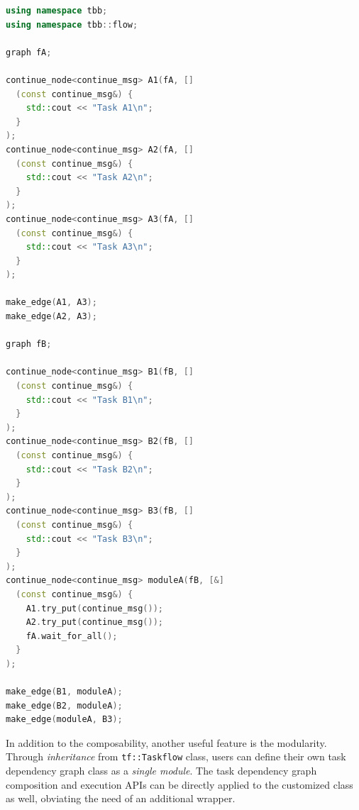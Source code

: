 \documentclass[conference]{IEEEtran}
\begin{document}
\begin{lstlisting}[language=C++,label=tbb_composition,caption={TBB hard-coded composition code (48 LOC and 256 tokens).}] 
using namespace tbb;
using namespace tbb::flow;

graph fA;

continue_node<continue_msg> A1(fA, [] 
  (const continue_msg&) {
    std::cout << "Task A1\n"; 
  }
);
continue_node<continue_msg> A2(fA, [] 
  (const continue_msg&) {
    std::cout << "Task A2\n"; 
  }
);
continue_node<continue_msg> A3(fA, [] 
  (const continue_msg&) {
    std::cout << "Task A3\n"; 
  }
);

make_edge(A1, A3);
make_edge(A2, A3);

graph fB;

continue_node<continue_msg> B1(fB, [] 
  (const continue_msg&) {
    std::cout << "Task B1\n"; 
  }
);
continue_node<continue_msg> B2(fB, [] 
  (const continue_msg&) {
    std::cout << "Task B2\n"; 
  }
);
continue_node<continue_msg> B3(fB, [] 
  (const continue_msg&) {
    std::cout << "Task B3\n"; 
  }
);
continue_node<continue_msg> moduleA(fB, [&] 
  (const continue_msg&) {
    A1.try_put(continue_msg());
    A2.try_put(continue_msg());
    fA.wait_for_all();
  }
);

make_edge(B1, moduleA);
make_edge(B2, moduleA);
make_edge(moduleA, B3);

\end{lstlisting}

In addition to the composability, another useful feature %
is the modularity.  Through \emph{inheritance} from \lstinline{tf::Taskflow} class, users
can define their own task dependency graph class as a \emph{single module}.  
The task dependency graph composition and execution APIs can be directly applied to
the customized class as well, obviating the need of an additional wrapper.

\end{document}
